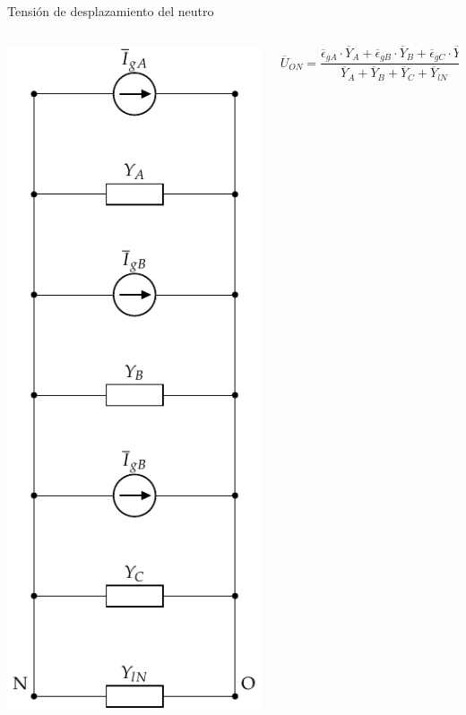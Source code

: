 \documentclass[aspectratio=169, usenames,svgnames,dvipsnames]{beamer}
\begin{document}
\begin{frame}[label={sec:orgb40c869}]{Tensión de desplazamiento del neutro}
\begin{columns}
\begin{column}{0.4\columnwidth}
\begin{center}
\includegraphics[height=0.9\textheight]{../figs/CircuitoTrifasicaGeneralizado3.pdf}
\end{center}
\end{column}

\begin{column}{0.7\columnwidth}
\[
  \overline{U}_{ON} = \frac{\overline{\epsilon}_{gA} \cdot \overline{Y}_A + \overline{\epsilon}_{gB} \cdot \overline{Y}_B + \overline{\epsilon}_{gC} \cdot \overline{Y}_C}{\overline{Y}_A + \overline{Y}_B + \overline{Y}_C + \overline{Y}_{lN}}
\]
\end{column}
\end{columns}
\end{frame}
\end{document}
